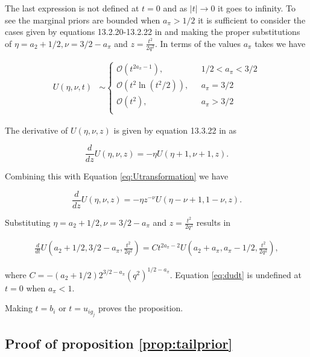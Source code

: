 The last expression is not defined at $t=0$ and as $|t| \to 0$ it goes to infinity. To see the marginal priors are bounded when $a_\pi>1/2$ it is sufficient to consider the cases given by equations 13.2.20-13.2.22 in  \cite{nisthandbook} and making the proper substitutions of $\eta=a_2+1/2, \nu= 3/2-a_\pi$ and $z=\frac{t^2}{2q^2} $. In terms of the values  $a_\pi$ takes we have

\begin{align*}
U(\eta, \nu, t)&\sim
\begin{cases}
	 \mathcal{O} \left( t^{2a_\pi-1}   \right), \ \ \  &1/2<a_\pi<3/2 \\
	 \mathcal{O} \left( t^2 \ln(t^2/2)   \right), \ \ \  &a_\pi=3/2 \\
	 \mathcal{O} \left( t^2  \right), \ \ \  &a_\pi>3/2 \\
\end{cases}
\end{align*}

The derivative of $U(\eta, \nu, z)$ is given by equation 13.3.22 in \cite{nisthandbook} as

\[ \frac{d}{dz}  U(\eta, \nu, z)= - \eta U(\eta+1, \nu+1, z).   \]

Combining this with Equation \eqref{eq:Utransformation} we have

\[  \frac{d}{dz}  U(\eta, \nu, z) = -\eta z^{-\nu} U(\eta-\nu  +1, 1- \nu, z ).    \]

Substituting $\eta=a_2+1/2, \nu= 3/2-a_\pi$ and $z= \frac{t^2}{2q^2}$ results in


\begin{align}
\label{eq:dudt}
\frac{d}{dt}  U\left( a_2+1/2 , 3/2-a_\pi , \frac{t^2}{2q^2} \right) = C t^{2a_\pi-2} U\left( a_2+a_\pi, a_\pi-1/2, \frac{t^2}{2q^2} \right),
\end{align}

where $C=-(a_2+1/2)2^{3/2-a_\pi}(q^2)^{1/2-a_\pi}$. Equation \eqref{eq:dudt} is undefined at $t=0$ when $a_\pi<1$.

Making $t=b_i$ or $t=u_{ig_j}$ proves the proposition. \\



\subsection*{Proof of proposition \ref{prop:tailprior}}

